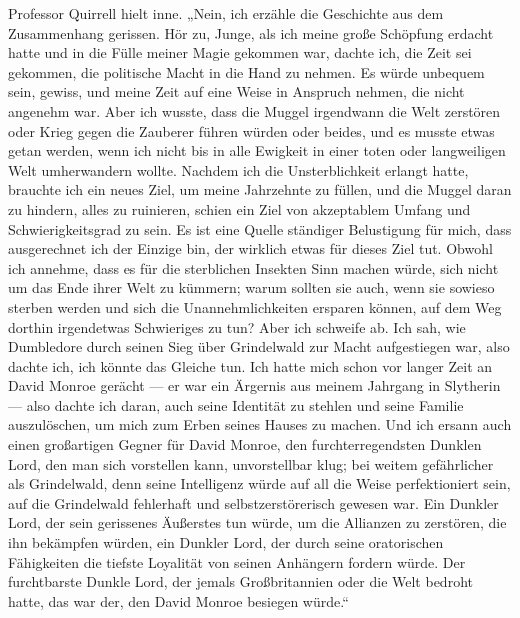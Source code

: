 Professor Quirrell hielt inne.
„Nein, ich erzähle die Geschichte aus dem Zusammenhang gerissen. Hör zu, Junge, als ich meine große Schöpfung erdacht hatte und in die Fülle meiner Magie gekommen war, dachte ich, die Zeit sei gekommen, die politische Macht in die Hand zu nehmen. Es würde unbequem sein, gewiss, und meine Zeit auf eine Weise in Anspruch nehmen, die nicht angenehm war. Aber ich wusste, dass die Muggel irgendwann die Welt zerstören oder Krieg gegen die Zauberer führen würden oder beides, und es musste etwas getan werden, wenn ich nicht bis in alle Ewigkeit in einer toten oder langweiligen Welt umherwandern wollte. Nachdem ich die Unsterblichkeit erlangt hatte, brauchte ich ein neues Ziel, um meine Jahrzehnte zu füllen, und die Muggel daran zu hindern, alles zu ruinieren, schien ein Ziel von akzeptablem Umfang und Schwierigkeitsgrad zu sein. Es ist eine Quelle ständiger Belustigung für mich, dass ausgerechnet ich der Einzige bin, der wirklich etwas für dieses Ziel tut. Obwohl ich annehme, dass es für die sterblichen Insekten Sinn machen würde, sich nicht um das Ende ihrer Welt zu kümmern; warum sollten sie auch, wenn sie sowieso sterben werden und sich die Unannehmlichkeiten ersparen können, auf dem Weg dorthin irgendetwas Schwieriges zu tun? Aber ich schweife ab. Ich sah, wie Dumbledore durch seinen Sieg über Grindelwald zur Macht aufgestiegen war, also dachte ich, ich könnte das Gleiche tun. Ich hatte mich schon vor langer Zeit an David Monroe gerächt — er war ein Ärgernis aus meinem Jahrgang in Slytherin — also dachte ich daran, auch seine Identität zu stehlen und seine Familie auszulöschen, um mich zum Erben seines Hauses zu machen. Und ich ersann auch einen großartigen Gegner für David Monroe, den furchterregendsten Dunklen Lord, den man sich vorstellen kann, unvorstellbar klug; bei weitem gefährlicher als Grindelwald, denn seine Intelligenz würde auf all die Weise perfektioniert sein, auf die Grindelwald fehlerhaft und selbstzerstörerisch gewesen war. Ein Dunkler Lord, der sein gerissenes Äußerstes tun würde, um die Allianzen zu zerstören, die ihn bekämpfen würden, ein Dunkler Lord, der durch seine oratorischen Fähigkeiten die tiefste Loyalität von seinen Anhängern fordern würde. Der furchtbarste Dunkle Lord, der jemals Großbritannien oder die Welt bedroht hatte, das war der, den David Monroe besiegen würde.“

